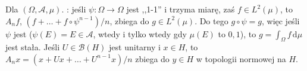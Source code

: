 Dla  $(\Omega, \mathcal A, \mu)$.
: jeśli $\psi \colon \Omega \to \Omega$ jest ,,1-1'' i trzyma miarę, zaś $f \in L^2(\mu)$, to $A_nf$, $(f + \dots + f \circ \psi^{n-1})/n$, zbiega do $g \in L^2(\mu)$.
Do tego $g \circ \psi = g$, więc jeśli $\psi$ jest  ($\psi(E) = E \in \mathcal A$, wtedy i tylko wtedy gdy $\mu(E)$ to $0, 1$), to $g = \int_\Omega f \,\textrm{d}\mu$ jest stała.
Jeśli $U \in \mathcal B(H)$ jest unitarny  i $x\in H$, to $A_n x = (x + Ux + \dots + U^{n-1}x)/n$ zbiega do $y \in H$ w topologii normowej na $H$.